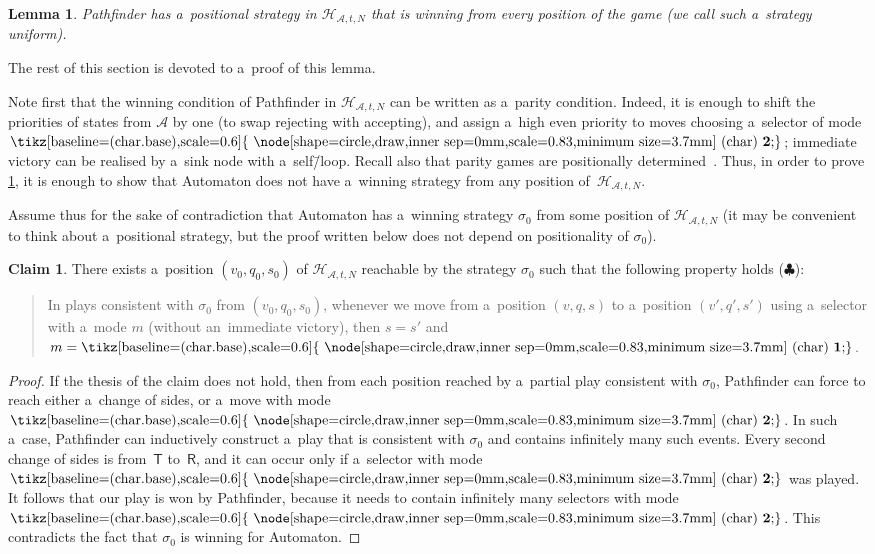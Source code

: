 \documentclass[11pt,a4paper]{amsart}
\theoremstyle{plain}
\newtheorem{lem}[thm]{Lemma}
\theoremstyle{definition}
\newtheorem{clm}[thm]{Claim}
\theoremstyle{defC}
\theoremstyle{thmC}
\theoremstyle{plain}
\numberwithin{equation}{section}
\numberwithin{equation}{section}
\numberwithin{figure}{section}
\newcommand{\mathcalsym}[1]{\ensuremath{\mathcal{#1}}\xspace}
\newcommand{\CA}{\mathcalsym{A}}
\newcommand{\CH}{\mathcalsym{H}}
\newcommand{\sT}{\mathsf{T}}
\newcommand{\sR}{\mathsf{R}}
\newcommand*\circled[1]{\tikz[baseline=(char.base),scale=0.6]{
            \node[shape=circle,draw,inner sep=0mm,scale=0.83,minimum size=3.7mm] (char) {\textbf{#1}};}}
\newcommand{\fb}{\mathbf{\text{\circled{2}}}}
\newcommand{\fg}{\mathbf{\text{\circled{1}}}}
\begin{document}
\begin{lem}\label{lem:pathfinder-wins}
	Pathfinder has a~positional strategy in $\CH_{\CA,t,N}$ that is winning from every position of the game (we call such a~strategy \emph{uniform}).
\end{lem}
\noindent %
The rest of this section is devoted to a~proof of this lemma.

Note first that the winning condition of Pathfinder in $\CH_{\CA,t,N}$ can be written as a~parity condition.
Indeed, it is enough to shift the priorities of states from $\CA$ by one (to swap rejecting with accepting), and assign a~high even priority to moves choosing a~selector of mode $\fb$;
immediate victory can be realised by a~sink node with a~self\=/loop.
Recall also that parity games are positionally determined~\cite{jutla_determinacy,mostowski_parity_games}.
Thus, in order to prove \cref{lem:pathfinder-wins}, it is enough to show that Automaton does not have a~winning strategy from any position of~$\CH_{\CA,t,N}$.

Assume thus for the sake of contradiction that Automaton has a~winning strategy $\sigma_0$ from some position of $\CH_{\CA,t,N}$
(it may be convenient to think about a~positional strategy, but the proof written below does not depend on positionality of $\sigma_0$).

\begin{clm}
\label{cl:no-change-sides}
	There exists a~position $(v_0,q_0,s_0)$ of $\CH_{\CA,t,N}$ reachable by the strategy $\sigma_0$ such that the following property holds ($\clubsuit$):
	\begin{quote}
		In plays consistent with $\sigma_0$ from $(v_0,q_0,s_0)$, whenever we move from a~position $(v,q,s)$ to a~position $(v',q',s')$ using a~selector with a~mode $m$ (without an~immediate victory), then $s=s'$ and $m=\fg$.
	\end{quote}
\end{clm}

\begin{proof}
	If the thesis of the claim does not hold, then from each position reached by a~partial play consistent with $\sigma_0$, Pathfinder can force to reach either a~change of sides,
	or a~move with mode $\fb$.
	In such a~case, Pathfinder can inductively construct a~play that is consistent with $\sigma_0$ and contains infinitely many such events.
	Every second change of sides is from~$\sT$ to~$\sR$, and it can occur only if a~selector with mode $\fb$ was played.
	It follows that our play is won by Pathfinder, because it needs to contain infinitely many selectors with mode $\fb$.
	This contradicts the fact that $\sigma_0$ is winning for Automaton.
\end{proof}
\end{document}
